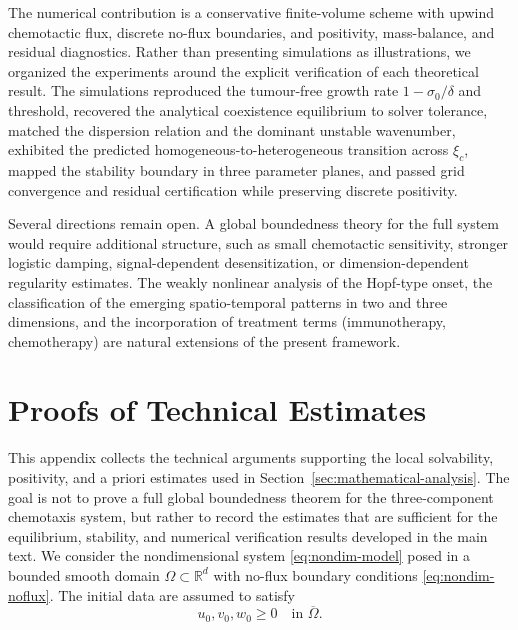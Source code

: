 \documentclass[a4paper,fleqn,longmktitle]{cas-sc}
\theoremstyle{plain}
\theoremstyle{definition}
\numberwithin{equation}{section}
\begin{document}
The numerical contribution is a conservative finite-volume scheme with upwind
chemotactic flux, discrete no-flux boundaries, and positivity, mass-balance, and
residual diagnostics. Rather than presenting simulations as illustrations, we
organized the experiments around the explicit verification of each theoretical
result. The simulations reproduced the tumour-free growth rate $1-\sigma_0/\delta$
and threshold, recovered the analytical coexistence equilibrium to solver
tolerance, matched the dispersion relation and the dominant unstable wavenumber,
exhibited the predicted homogeneous-to-heterogeneous transition across $\xi_c$,
mapped the stability boundary in three parameter planes, and passed grid
convergence and residual certification while preserving discrete positivity.

Several directions remain open. A global boundedness theory for the full system
would require additional structure, such as small chemotactic sensitivity,
stronger logistic damping, signal-dependent desensitization, or
dimension-dependent regularity estimates. The weakly nonlinear analysis of the
Hopf-type onset, the classification of the emerging spatio-temporal patterns in
two and three dimensions, and the incorporation of treatment terms
(immunotherapy, chemotherapy) are natural extensions of the present framework.

\appendix
\section{Proofs of Technical Estimates}
\label{app:technical-estimates}

This appendix collects the technical arguments supporting the local solvability,
positivity, and a priori estimates used in Section~\ref{sec:mathematical-analysis}.
The goal is not to prove a full global boundedness theorem for the
three-component chemotaxis system, but rather to record the estimates that are
sufficient for the equilibrium, stability, and numerical verification results
developed in the main text.
We consider the nondimensional system \eqref{eq:nondim-model}
posed in a bounded smooth domain $\Omega\subset\mathbb R^d$ with no-flux
boundary conditions \eqref{eq:nondim-noflux}.
The initial data are assumed to satisfy
\[
u_0,v_0,w_0\ge0
\quad\text{in }\overline\Omega .
\]
\end{document}
